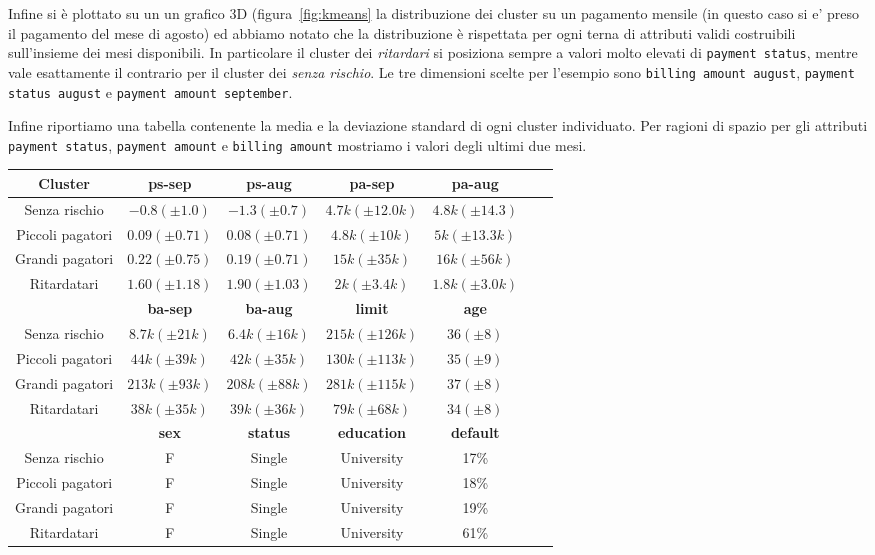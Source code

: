 Infine si \`e plottato su un un grafico 3D (figura~\ref{fig:kmeans}
la distribuzione dei cluster su un pagamento mensile (in questo 
caso si e' preso il pagamento del mese di agosto) ed abbiamo 
notato che la distribuzione \`e rispettata per ogni terna di attributi
validi costruibili sull'insieme dei mesi disponibili.
In particolare il cluster dei \textit{ritardari} si posiziona sempre a valori molto elevati di \texttt{payment status}, mentre vale
esattamente il contrario per il cluster dei \textit{senza rischio}.
Le tre
dimensioni scelte per l'esempio sono \texttt{billing amount august},
\texttt{payment status august} e \texttt{payment amount september}.

Infine riportiamo una tabella contenente la media e la deviazione 
standard di ogni cluster individuato. Per ragioni di spazio per 
gli attributi \texttt{payment status}, \texttt{payment amount}
e \texttt{billing amount} mostriamo i valori degli ultimi due mesi.

\begin{center}
	
\begin{tabular}{c|c|c|c|c|c|c}
	\hline
	\textbf{Cluster} & \textbf{ps-sep} 
	& \textbf{ps-aug} & \textbf{pa-sep} 
	& \textbf{pa-aug}\\
	\hline
	Senza rischio & 
	$-0.8 (\pm 1.0)$ & 
	$-1.3 (\pm 0.7)$ &
	$4.7k (\pm 12.0k)$ &
	$4.8k (\pm 14.3)$\\
	\hline
	Piccoli pagatori & 
	$0.09 (\pm 0.71)$ & 
	$0.08 (\pm 0.71)$ &
	$4.8k (\pm 10k)$ &
	$5k (\pm 13.3k)$\\
	\hline
	Grandi pagatori & 
	$0.22 (\pm 0.75)$ & 
	$0.19 (\pm 0.71)$ &
	$15k (\pm 35k)$ &
	$16k (\pm 56k)$\\
	\hline
	Ritardatari & 
	$1.60 (\pm 1.18)$ & 
	$1.90 (\pm 1.03)$ &
	$2k (\pm 3.4k)$ &
	$1.8k (\pm 3.0k)$\\
	\hline
	& 
	\textbf{ba-sep} & 
	\textbf{ba-aug} & 
	\textbf{limit} & 
	\textbf{age} &\\
	\hline
	Senza rischio & 
	$8.7k (\pm 21k)$ &
	$6.4k (\pm 16k)$ &
	$215k (\pm 126k)$ &
	$36 (\pm 8)$\\
	\hline
	Piccoli pagatori &
	$44k (\pm 39k)$ &
	$42k (\pm 35k)$ &
	$130k (\pm 113k)$ &
	$35 (\pm 9)$\\
	\hline
	Grandi pagatori &
	$213k (\pm 93k)$ &
	$208k (\pm 88k)$ &
	$281k (\pm 115k)$ &
	$37 (\pm 8)$\\
	\hline
	Ritardatari &
	$38k (\pm 35k)$ &
	$39k (\pm 36k)$ &
	$79k (\pm 68k)$ &
	$34 (\pm 8)$\\
	\hline
	& 
	\textbf{sex} & 
	\textbf{status} & 
	\textbf{education} & 
	\textbf{default}\\
	\hline
	Senza rischio & 
	F &
	Single &
	University&
	17\%\\
	\hline
	Piccoli pagatori & 
	F &
	Single &
	University&
	18\%\\
	\hline
	Grandi pagatori & 
	F &
	Single &
	University&
	19\%\\
	\hline
	Ritardatari & 
	F &
	Single &
	University&
	61\%\\
	\hline
\end{tabular}

\end{center}

